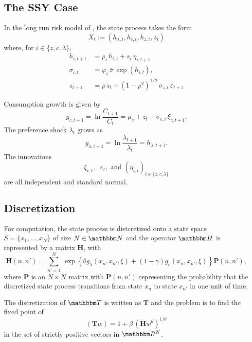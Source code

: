 \documentclass[12pt, reqno]{amsart}
\newcommand{\1}{\mathbbm 1}
\newcommand{\RR}{\mathbbm R}
\newcommand{\NN}{\mathbbm N}
\newcommand{\TT}{\mathbbm T}
\newcommand{\HH}{\mathbbm H}
\newcommand{\bH}{\mathbf H}
\newcommand{\bT}{\mathbf T}
\renewcommand{\phi}{\varphi}
\renewcommand{\epsilon}{\varepsilon}
\newcommand{\bP}{\mathbf P}
\theoremstyle{plain}
\theoremstyle{definition}
\begin{document}
\subsection{The SSY Case}

In the long run risk model of \cite{schorfheide2018identifying}, the state
process takes the form 
%
\begin{equation*}
    X_t := (h_{\lambda, t}, h_{c, t}, h_{z, t}, z_t)  
\end{equation*}
%
where, for $i \in \{z, c, \lambda\}$,
%
\begin{align*}
    h_{i, t+1}
        & = \rho_i \, h_{i,t} + s_{i} \, \eta_{i, t+1}
        \\
    \sigma_{i,t} 
        & = \phi_i \, \bar{\sigma} \, \exp(h_{i,t}),
        \\
    z_{t+1} 
        & = \rho \, z_t + (1 - \rho^2)^{1/2} \, 
                \sigma_{z, t} \, \epsilon_{t+1}
\end{align*}
%


Consumption growth is given by 
%
\begin{equation}\label{eq:ssygc}
    g_{c, t+1}
    = \ln \frac{C_{t+1}}{C_t} 
    = \mu_c + z_t + \sigma_{c, t} \, \xi_{c, t+1} .
\end{equation}
%
The preference shock $\lambda_t$ grows as
%
\begin{equation*}
    g_{\lambda, t+1}
    = \ln \frac{\lambda_{t+1}}{\lambda_t} 
    = h_{\lambda, t+1}.
\end{equation*}
%
The innovations 
%
\begin{equation*}
    \xi_{c, t}, \;\;  \epsilon_t, \text{ and } (\eta_{i, t})_{i \in \{z, c, \lambda\}}
\end{equation*}
%
are all independent and standard normal.  


\subsection{Discretization}

For computation, the state process is distcretized onto a state space $S =
\{x_1, \ldots, x_N\}$ of size $N \in \NN$ and the operator $\HH$ is
represented by a matrix $\bH$, with 
%
\begin{equation}\label{eq:defkb}
    \bH(n, n') = \sum_{n'=1}^N 
        \,
        \exp
        \left\{ 
            \theta g_\lambda(x_n, x_{n'}, \xi) 
            + (1-\gamma) g_c(x_n, x_{n'}, \xi)
        \right\}
    \bP(n, n'),
\end{equation}
%
where $\bP$ is an $N \times N$ matrix with  $\bP(n, n')$ representing the
probability that the discretized state process transitions from state $x_n$ to
state $x_{n'}$ in one unit of time.

The discretization of $\TT$ is written as $\bT$ and the problem is to find the
fixed point of 
%
\begin{equation}\label{eq:wcopd}
    (\bT w) = 1 + \beta \,  (\bH w^\theta)^{1/\theta}
\end{equation}
%
in the set of strictly positive vectors in $\RR^N$.








\end{document}
